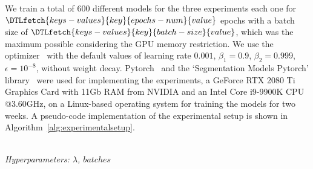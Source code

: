\documentclass{elsarticle}
\begin{document}
We train a total of $600$ different models for the three experiments each one for $\DTLfetch{keys-values}{key}{epochs-num}{value}$ epochs with a batch size of $\DTLfetch{keys-values}{key}{batch-size}{value}$, which was the maximum possible considering the GPU memory restriction.
We use the optimizer~\cite{kingma2014adam} with the default values of learning rate $0.001$, $\beta_1=0.9$, $\beta_2=0.999$, $\epsilon=10^{-8}$, without weight decay.
Pytorch~\cite{paszke2019pytorch} and the `Segmentation Models Pytorch' library~\cite{yakubovskiy2019segmentation} were used for implementing the experiments, a GeForce RTX 2080 Ti Graphics Card with 11Gb RAM from NVIDIA and an Intel Core i9-9900K CPU @3.60GHz, on a Linux-based operating system for training the models for two weeks. %
A pseudo-code implementation of the experimental setup is shown in Algorithm~\ref{alg:experimentalsetup}.

\begin{algorithm}[H]
  \caption{Experimental setup}\label{alg:experimentalsetup}
  \begin{algorithmic}[1]
    \renewcommand{\algorithmicrequire}{\textbf{Input:}}
    \renewcommand{\algorithmicensure}{\textbf{Output:}}
    \\ \textit{Hyperparameters:  $\lambda$, $batches$}
    \ENDFOR{}
    \ENDFOR{}
    \ENDIF{}
    \ENDFOR{}
    \ENDFOR{}
    \ENDFOR{}
    \ENDFOR{}
    \ENDFOR{}
  \end{algorithmic}
\end{algorithm}
\end{document}

